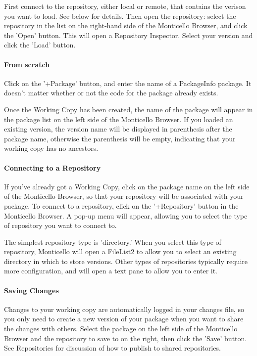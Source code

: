 \documentclass[a4paper,10pt,twoside]{book}
\begin{document}
First connect to the repository, either local or remote, that contains the verison you want to load. See below for details. Then open the repository: select the repository in the list on the right-hand side of the Monticello Browser, and click the 'Open' button. This will open a Repository Inspector. Select your version and click the 'Load' button.

\paragraph{From scratch}

Click on the '+Package' button, and enter the name of a PackageInfo package. It doesn't matter whether or not the code for the package already exists.

Once the Working Copy has been created, the name of the package will appear in the package list on the left side of the Monticello Browser. If you loaded an existing version, the version name will be displayed in parenthesis after the package name, otherwise the parenthesis will be empty, indicating that your working copy has no ancestors.

\paragraph{Connecting to a Repository}

If you've already got a Working Copy, click on the package name on the left side of the Monticello Browser, so that your repository will be associated with your package. To connect to a repository, click on the '+Repository' button in the Monticello Browser. A pop-up menu will appear, allowing you to select the type of repository you want to connect to.

The simplest repository type is 'directory.' When you select this type of repository, Monticello will open a FileList2 to allow you to select an existing directory in which to store versions. Other types of repositories typically require more configuration, and will open a text pane to allow you to enter it.

\paragraph{Saving Changes}

Changes to your working copy are automatically logged in your changes file, so you only need to create a new version of your package when you want to share the changes with others. Select the package on the left side of the Monticello Browser and the repository to save to on the right, then click the 'Save' button. See Repositories for discussion of how to publish to shared repositories.
\end{document}
